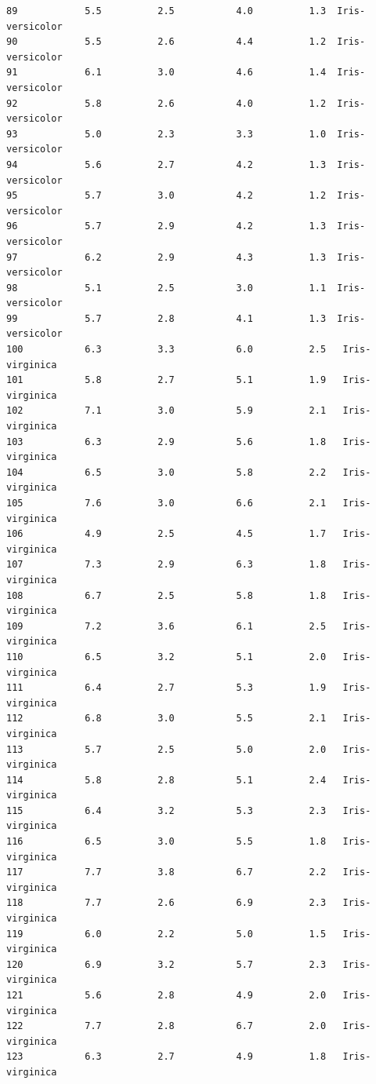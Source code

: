 \documentclass [oneside,10pt,a4paper,ngerman,BCOR10mm,headsepline,parindent,final]{scrartcl}
\begin{document}
\begin{tcolorbox}[breakable, size=fbox, boxrule=.5pt, pad at break*=1mm, opacityfill=0]
\begin{Verbatim}[commandchars=\\\{\}]
89            5.5          2.5           4.0          1.3  Iris-versicolor
90            5.5          2.6           4.4          1.2  Iris-versicolor
91            6.1          3.0           4.6          1.4  Iris-versicolor
92            5.8          2.6           4.0          1.2  Iris-versicolor
93            5.0          2.3           3.3          1.0  Iris-versicolor
94            5.6          2.7           4.2          1.3  Iris-versicolor
95            5.7          3.0           4.2          1.2  Iris-versicolor
96            5.7          2.9           4.2          1.3  Iris-versicolor
97            6.2          2.9           4.3          1.3  Iris-versicolor
98            5.1          2.5           3.0          1.1  Iris-versicolor
99            5.7          2.8           4.1          1.3  Iris-versicolor
100           6.3          3.3           6.0          2.5   Iris-virginica
101           5.8          2.7           5.1          1.9   Iris-virginica
102           7.1          3.0           5.9          2.1   Iris-virginica
103           6.3          2.9           5.6          1.8   Iris-virginica
104           6.5          3.0           5.8          2.2   Iris-virginica
105           7.6          3.0           6.6          2.1   Iris-virginica
106           4.9          2.5           4.5          1.7   Iris-virginica
107           7.3          2.9           6.3          1.8   Iris-virginica
108           6.7          2.5           5.8          1.8   Iris-virginica
109           7.2          3.6           6.1          2.5   Iris-virginica
110           6.5          3.2           5.1          2.0   Iris-virginica
111           6.4          2.7           5.3          1.9   Iris-virginica
112           6.8          3.0           5.5          2.1   Iris-virginica
113           5.7          2.5           5.0          2.0   Iris-virginica
114           5.8          2.8           5.1          2.4   Iris-virginica
115           6.4          3.2           5.3          2.3   Iris-virginica
116           6.5          3.0           5.5          1.8   Iris-virginica
117           7.7          3.8           6.7          2.2   Iris-virginica
118           7.7          2.6           6.9          2.3   Iris-virginica
119           6.0          2.2           5.0          1.5   Iris-virginica
120           6.9          3.2           5.7          2.3   Iris-virginica
121           5.6          2.8           4.9          2.0   Iris-virginica
122           7.7          2.8           6.7          2.0   Iris-virginica
123           6.3          2.7           4.9          1.8   Iris-virginica

\end{Verbatim}
\end{tcolorbox}
\end{document}
